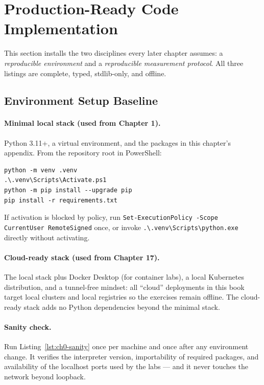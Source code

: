 \section{Production-Ready Code Implementation}
\label{sec:ch0-code}

This section installs the two disciplines every later chapter assumes:
a \emph{reproducible environment} and a \emph{reproducible measurement
protocol}. All three listings are complete, typed, stdlib-only, and offline.

\subsection{Environment Setup Baseline}
\label{sec:ch0-env}

\paragraph{Minimal local stack (used from Chapter 1).}
Python 3.11+, a virtual environment, and the packages in this chapter's
appendix. From the repository root in PowerShell:

\begin{verbatim}
python -m venv .venv
.\.venv\Scripts\Activate.ps1
python -m pip install --upgrade pip
pip install -r requirements.txt
\end{verbatim}

If activation is blocked by policy, run
\texttt{Set-ExecutionPolicy -Scope CurrentUser RemoteSigned} once, or invoke
\texttt{.\textbackslash .venv\textbackslash Scripts\textbackslash python.exe}
directly without activating.

\paragraph{Cloud-ready stack (used from Chapter 17).}
The local stack plus Docker Desktop (for container labs), a local Kubernetes
distribution, and a tunnel-free mindset: all ``cloud'' deployments in this
book target local clusters and local registries so the exercises remain
offline. The cloud-ready stack adds no Python dependencies beyond the
minimal stack.

\paragraph{Sanity check.}
Run Listing~\ref{lst:ch0-sanity} once per machine and once after any
environment change. It verifies the interpreter version, importability of
required packages, and availability of the localhost ports used by the labs
--- and it never touches the network beyond loopback.

